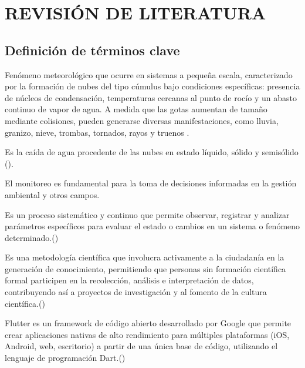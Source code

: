 \chapter{REVISIÓN DE LITERATURA}
\label{cap:3}

\section{Definición de términos clave}
\begin{definition}[Precipitación]
 Fenómeno meteorológico que ocurre en sistemas a pequeña escala, caracterizado por la formación de nubes del tipo cúmulus bajo condiciones específicas: presencia de núcleos de condensación, temperaturas cercanas al punto de rocío y un abasto continuo de vapor de agua. A medida que las gotas aumentan de tamaño mediante colisiones, pueden generarse diversas manifestaciones, como lluvia, granizo, nieve, trombas, tornados, rayos y truenos \cite{ahrens2020}.
\end{definition}

\begin{definition}[Lluvia]
    Es la caída de agua procedente de las nubes en estado líquido, sólido y semisólido (\cite{breña2013}).
\end{definition}


El monitoreo es fundamental para la toma de decisiones informadas en la gestión ambiental y otros campos.
\begin{definition}[Monitoreo]
  Es un proceso sistemático y continuo que permite observar, registrar y analizar parámetros específicos para evaluar el estado o cambios en un sistema o fenómeno determinado.(\cite{ciga_monitoreo})
\end{definition}


\begin{definition}
Es una metodología científica que involucra activamente a la ciudadanía en la generación de conocimiento, permitiendo que personas sin formación científica formal participen en la recolección, análisis e interpretación de datos, contribuyendo así a proyectos de investigación y al fomento de la cultura científica.(\cite{csic_ciencia_ciudadana})
\end{definition}


\begin{definition}[Flutter]
Flutter es un framework de código abierto desarrollado por Google que permite crear aplicaciones nativas de alto rendimiento para múltiples plataformas (iOS, Android, web, escritorio) a partir de una única base de código, utilizando el lenguaje de programación Dart.(\cite{flutter_multiplataforma})
\end{definition}

